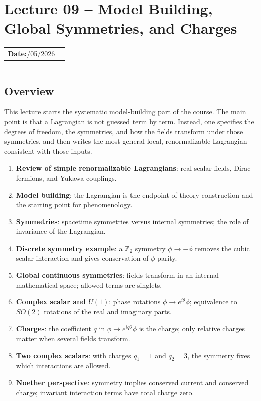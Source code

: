 \documentclass[../main.tex]{subfiles}
\begin{document}
\section{Lecture 09 -- Model Building, Global Symmetries, and Charges}\label{sec:lec09}
\begin{center}
\begin{tabular}{ll}
  \textbf{Date:}\quad 07/05/2026 & \\
\end{tabular}
\end{center}
\hrule\vspace{1.5em}

\subsection*{Overview}

This lecture starts the systematic model-building part of the course.  The main point is that a Lagrangian is not guessed term by term.  Instead, one specifies the degrees of freedom, the symmetries, and how the fields transform under those symmetries, and then writes the most general local, renormalizable Lagrangian consistent with those inputs.

\begin{enumerate}
  \item \textbf{Review of simple renormalizable Lagrangians}: real scalar fields, Dirac fermions, and Yukawa couplings.
  \item \textbf{Model building}: the Lagrangian is the endpoint of theory construction and the starting point for phenomenology.
  \item \textbf{Symmetries}: spacetime symmetries versus internal symmetries; the role of invariance of the Lagrangian.
  \item \textbf{Discrete symmetry example}: a $\mathbb{Z}_2$ symmetry $\phi\to-\phi$ removes the cubic scalar interaction and gives conservation of $\phi$-parity.
  \item \textbf{Global continuous symmetries}: fields transform in an internal mathematical space; allowed terms are singlets.
  \item \textbf{Complex scalar and $U(1)$}: phase rotations $\phi\to e^{i\theta}\phi$; equivalence to $SO(2)$ rotations of the real and imaginary parts.
  \item \textbf{Charges}: the coefficient $q$ in $\phi\to e^{iq\theta}\phi$ is the charge; only relative charges matter when several fields transform.
  \item \textbf{Two complex scalars}: with charges $q_1=1$ and $q_2=3$, the symmetry fixes which interactions are allowed.
  \item \textbf{Noether perspective}: symmetry implies conserved current and conserved charge; invariant interaction terms have total charge zero.
\end{enumerate}
\end{document}
